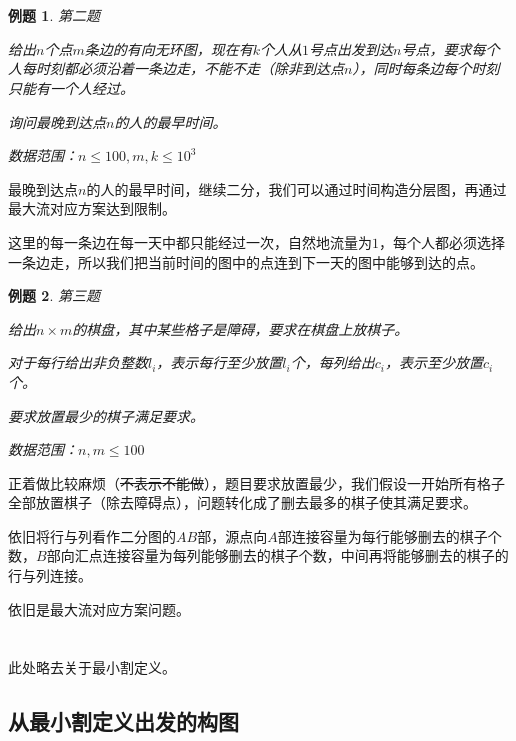 \documentclass[a4paper]{article}
\newcommand{\kai}{\CJKfamily{kai}}
\newtheorem{problem}{例题}
\begin{document}
~\\
~\\


\begin{problem}
  第二题%

  给出$n$个点$m$条边的有向无环图，现在有$k$个人从$1$号点出发到达$n$号点，要求每个人每时刻都必须沿着一条边走，不能不走（除非到达点$n$），同时每条边每个时刻只能有一个人经过。

  询问最晚到达点$n$的人的最早时间。

  数据范围：$n\leq 100, m,k\leq 10^3$
\end{problem}

最晚到达点$n$的人的最早时间，继续二分，我们可以通过时间构造分层图，再通过最大流对应方案达到限制。

这里的每一条边在每一天中都只能经过一次，自然地流量为$1$，每个人都必须选择一条边走，所以我们把当前时间的图中的点连到下一天的图中能够到达的点。

\newpage

\begin{problem}
  第三题

  给出$n\times m$的棋盘，其中某些格子是障碍，要求在棋盘上放棋子。

  对于每行给出非负整数$l_i$，表示每行至少放置$l_i$个，每列给出$c_i$，表示至少放置$c_i$个。

  要求放置最少的棋子满足要求。
  
  数据范围：$n,m\leq 100$
\end{problem}

正着做比较麻烦（\sout{不表示不能做}），题目要求放置最少，我们假设一开始所有格子全部放置棋子（除去障碍点），问题转化成了删去最多的棋子使其满足要求。

依旧将行与列看作二分图的$AB$部，源点向$A$部连接容量为每行能够删去的棋子个数，$B$部向汇点连接容量为每列能够删去的棋子个数，中间再将能够删去的棋子的行与列连接。

依旧是最大流对应方案问题。

\newpage

\section{\kai {最小割模型}}

此处略去关于最小割定义。

\subsection{\kai 从最小割定义出发的构图}
\end{document}
